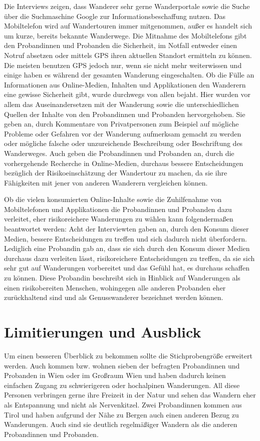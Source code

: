 Die Interviews zeigen, dass Wanderer sehr gerne Wanderportale sowie die Suche über die Suchmaschine Google zur Informationsbeschaffung nutzen. Das Mobiltelefon wird auf Wandertouren immer mitgenommen, außer es handelt sich um kurze, bereits bekannte Wanderwege. Die Mitnahme des Mobiltelefons gibt den Probandinnen und Probanden die Sicherheit, im Notfall entweder einen Notruf absetzen oder mittels GPS ihren aktuellen Standort ermitteln zu können. Die meisten benutzen GPS jedoch nur, wenn sie nicht mehr weiterwissen und einige haben es während der gesamten Wanderung eingeschalten. Ob die Fülle an Informationen aus Online-Medien, Inhalten und Applikationen den Wanderern eine gewisse Sicherheit gibt, wurde durchwegs von allen bejaht. Hier wurden vor allem das Auseinandersetzen mit der Wanderung sowie die unterschiedlichen Quellen der Inhalte von den Probandinnen und Probanden hervorgehoben. Sie geben an, durch Kommentare von Privatpersonen zum Beispiel auf mögliche Probleme oder Gefahren vor der Wanderung aufmerksam gemacht zu werden oder mögliche falsche oder unzureichende Beschreibung oder Beschriftung des Wanderweges. Auch geben die Probandinnen und Probanden an, durch die vorhergehende Recherche in Online-Medien, durchaus bessere Entscheidungen bezüglich der Risikoeinschätzung der Wandertour zu machen, da sie ihre Fähigkeiten mit jener von anderen Wanderern  vergleichen können.

Ob die vielen konsumierten Online-Inhalte sowie die Zuhilfenahme von Mobiltelefonen und Applikationen die Probandinnen und Probanden dazu verleitet, eher risikoreichere Wanderungen zu wählen kann folgendermaßen beantwortet werden:
Acht der Interviewten gaben an, durch den Konsum dieser Medien, bessere Entscheidungen zu treffen und sich dadurch nicht überfordern. Lediglich eine Probandin gab an, dass sie sich durch den Konsum dieser Medien durchaus dazu verleiten lässt, risikoreichere Entscheidungen zu treffen, da sie sich sehr gut auf Wanderungen vorbereitet und das Gefühl hat, es durchaus schaffen zu können.
Diese Probandin beschreibt sich in Hinblick auf Wanderungen als einen risikobereiten Menschen, wohingegen alle anderen Probanden eher zurückhaltend sind und als Genusswanderer bezeichnet werden können.

\section{Limitierungen und Ausblick}

Um einen besseren Überblick zu bekommen sollte die Stichprobengröße erweitert werden. Auch kommen bzw. wohnen sieben der befragten Probandinnen und Probanden in Wien oder im Großraum Wien und haben dadurch keinen einfachen Zugang zu schwierigeren oder hochalpinen Wanderungen. All diese Personen verbringen gerne ihre Freizeit in der Natur und sehen das Wandern eher als Entspannung und nicht als Nervenkitzel. Zwei Probandinnen kommen aus Tirol und haben aufgrund der Nähe zu Bergen auch einen anderen Bezug zu Wanderungen. Auch sind sie deutlich regelmäßiger Wandern als die anderen Probandinnen und Probanden.

